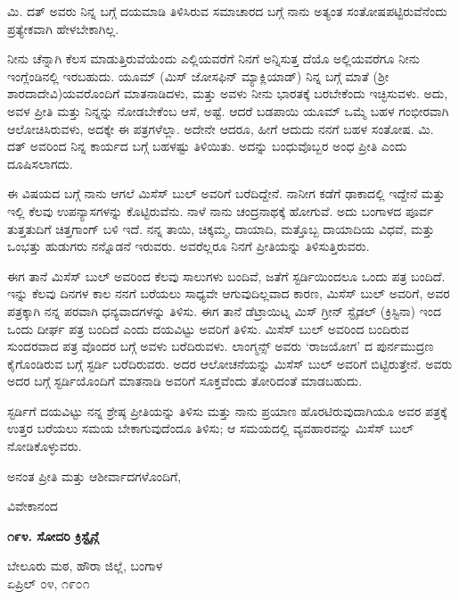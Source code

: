 ಮಿ. ದತ್ ಅವರು ನಿನ್ನ ಬಗ್ಗೆ ದಯಮಾಡಿ ತಿಳಿಸಿರುವ ಸಮಾಚಾರದ ಬಗ್ಗೆ ನಾನು ಅತ್ಯಂತ ಸಂತೋಷಪಟ್ಟಿರುವೆನೆಂದು ಪ್ರತ್ಯೇಕವಾಗಿ ಹೇಳಬೇಕಾಗಿಲ್ಲ.

ನೀನು ಚೆನ್ನಾಗಿ ಕೆಲಸ ಮಾಡುತ್ತಿರುವೆಯೆಂದು ಎಲ್ಲಿಯವರೆಗೆ ನಿನಗೆ ಅನ್ನಿಸುತ್ತ ದೆಯೊ ಅಲ್ಲಿಯವರೆಗೂ ನೀನು ಇಂಗ್ಲೆಂಡಿನಲ್ಲಿ ಇರಬಹುದು. ಯೂಮ್​ (ಮಿಸ್ ಜೋಸಫಿನ್ ಮ್ಯಾಕ್ಲಿಯಾಡ್) ನಿನ್ನ ಬಗ್ಗೆ ಮಾತೆ (ಶ‍್ರೀ ಶಾರದಾದೇವಿ)ಯವರೊಂದಿಗೆ ಮಾತನಾಡಿದಳು, ಮತ್ತು ಅವಳು ನೀನು ಭಾರತಕ್ಕೆ ಬರಬೇಕೆಂದು ಇಚ್ಛಿಸುವಳು. ಅದು, ಅವಳ ಪ್ರೀತಿ ಮತ್ತು ನಿನ್ನನ್ನು ನೋಡಬೇಕೆಂಬ ಆಸೆ, ಅಷ್ಟೆ. ಆದರೆ ಬಡಪಾಯಿ ಯೂಮ್​ ಒಮ್ಮೆ ಬಹಳ ಗಂಭೀರವಾಗಿ ಆಲೋಚಿಸಿರುವಳು, ಅದಕ್ಕೇ ಈ ಪತ್ರಗಳೆಲ್ಲಾ. ಅದೇನೇ ಆದರೂ, ಹೀಗೆ ಆದುದು ನನಗೆ ಬಹಳ ಸಂತೋಷ. ಮಿ. ದತ್ ಅವರಿಂದ ನಿನ್ನ ಕಾರ್ಯದ ಬಗ್ಗೆ ಬಹಳಷ್ಟು ತಿಳಿಯಿತು. ಅದನ್ನು ಬಂಧುವೊಬ್ಬರ ಅಂಧ ಪ್ರೀತಿ ಎಂದು ದೂಷಿಸಲಾಗದು.

ಈ ವಿಷಯದ ಬಗ್ಗೆ ನಾನು ಆಗಲೆ ಮಿಸೆಸ್ ಬುಲ್ ಅವರಿಗೆ ಬರೆದಿದ್ದೇನೆ. ನಾನೀಗ ಕಡೆಗೆ ಢಾಕಾದಲ್ಲಿ ಇದ್ದೇನೆ ಮತ್ತು ಇಲ್ಲಿ ಕೆಲವು ಉಪನ್ಯಾಸಗಳನ್ನು ಕೊಟ್ಟಿರುವೆನು. ನಾಳೆ ನಾನು ಚಂದ್ರನಾಥಕ್ಕೆ ಹೋಗುವೆ. ಅದು ಬಂಗಾಳದ ಪೂರ್ವ ತುತ್ತತುದಿಗೆ ಚಿತ್ತಗಾಂಗ್ ಬಳಿ ಇದೆ. ನನ್ನ ತಾಯಿ, ಚಿಕ್ಕಮ್ಮ, ದಾಯಾದಿ, ಮತ್ತೊಬ್ಬ ದಾಯಾದಿಯ ವಿಧವೆ, ಮತ್ತು ಒಂಭತ್ತು ಹುಡುಗರು ನನ್ನೊಡನೆ ಇರುವರು. ಅವರೆಲ್ಲರೂ ನಿನಗೆ ಪ್ರೀತಿಯನ್ನು ತಿಳಿಸುತ್ತಿರುವರು.

ಈಗ ತಾನೆ ಮಿಸೆಸ್ ಬುಲ್ ಅವರಿಂದ ಕೆಲವು ಸಾಲುಗಳು ಬಂದಿವೆ, ಜತೆಗೆ ಸ್ಟರ್ಡಿಯಿಂದಲೂ ಒಂದು ಪತ್ರ ಬಂದಿದೆ. ಇನ್ನು ಕೆಲವು ದಿನಗಳ ಕಾಲ ನನಗೆ ಬರೆಯಲು ಸಾಧ್ಯವೇ ಆಗುವುದಿಲ್ಲವಾದ ಕಾರಣ, ಮಿಸೆಸ್ ಬುಲ್ ಅವರಿಗೆ, ಅವರ ಪತ್ರಕ್ಕಾಗಿ ನನ್ನ ಪರವಾಗಿ ಧನ್ಯವಾದಗಳನ್ನು ತಿಳಿಸು. ಈಗ ತಾನೆ ಡೆಟ್ರಾಯಿಟ್ನ ಮಿಸ್ ಗ್ರೀನ್ ಸ್ಟೈಡಲ್ (ಕ್ರಿಸ್ಟಿನಾ) ಇಂದ ಒಂದು ದೀರ್ಘ ಪತ್ರ ಬಂದಿದೆ ಎಂದು ದಯವಿಟ್ಟು ಅವರಿಗೆ ತಿಳಿಸು. ಮಿಸೆಸ್ ಬುಲ್ ಅವರಿಂದ ಬಂದಿರುವ ಸುಂದರವಾದ ಪತ್ರ ವೊಂದರ ಬಗ್ಗೆ ಅವಳು ಬರೆದಿರುವಳು. ಲಾಂಗ್ಮನ್ಸ್ ಅವರು ‘ರಾಜಯೋಗ’ ದ ಪುರ್ನಮುದ್ರಣ ಕೈಗೊಂಡಿರುವ ಬಗ್ಗೆ ಸ್ಟರ್ಡಿ ಬರೆದಿರುವರು. ಅದರ ಆಲೋಚನೆಯನ್ನು ಮಿಸೆಸ್ ಬುಲ್ ಅವರಿಗೆ ಬಿಟ್ಟಿರುತ್ತೇನೆ. ಅವರು ಅದರ ಬಗ್ಗೆ ಸ್ಟರ್ಡಿಯೊಂದಿಗೆ ಮಾತನಾಡಿ ಅವರಿಗೆ ಸೂಕ್ತವೆಂದು ತೋರಿದಂತೆ ಮಾಡಬಹುದು.

ಸ್ಟರ್ಡಿಗೆ ದಯವಿಟ್ಟು ನನ್ನ ಶ್ರೇಷ್ಠ ಪ್ರೀತಿಯನ್ನು ತಿಳಿಸು ಮತ್ತು ನಾನು ಪ್ರಯಾಣ ಹೊರಟಿರುವುದಾಗಿಯೂ ಅವರ ಪತ್ರಕ್ಕೆ ಉತ್ತರ ಬರೆಯಲು ಸಮಯ ಬೇಕಾಗುವುದೆಂದೂ ತಿಳಿಸು; ಆ ಸಮಯದಲ್ಲಿ ವ್ಯವಹಾರವನ್ನು ಮಿಸೆಸ್ ಬುಲ್ ನೋಡಿಕೊಳ್ಳುವರು.

ಅನಂತ ಪ್ರೀತಿ ಮತ್ತು ಆಶೀರ್ವಾದಗಳೊಂದಿಗೆ,

\begin{flushright}
ವಿವೇಕಾನಂದ
\end{flushright}

\begin{center}
\textbf{೧೯೪. ಸೋದರಿ ಕ್ರಿಸ್ಟೈನ್ಗೆ}
\end{center}

\begin{flushright}
ಬೇಲೂರು ಮಠ, ಹೌರಾ ಜಿಲ್ಲೆ, ಬಂಗಾಳ\\ಏಪ್ರಿಲ್ ೦೪, ೧೯೦೧
\end{flushright}

